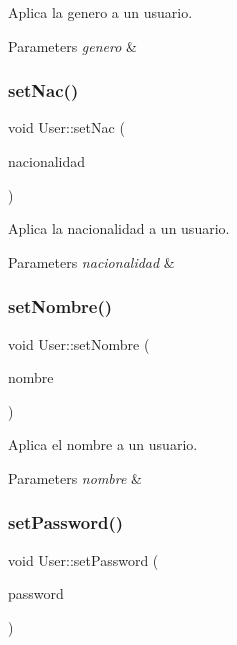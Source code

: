 Aplica la genero a un usuario. 


\begin{DoxyParams}{Parameters}
{\em genero} & \\
\hline
\end{DoxyParams}
\mbox{\label{classUser_ab3992a71bc607e8c919a7d9f941c9b4f}} 
\subsubsection{\texorpdfstring{set\+Nac()}{setNac()}}
{\footnotesize\ttfamily void User\+::set\+Nac (\begin{DoxyParamCaption}\item[{Q\+String}]{nacionalidad }\end{DoxyParamCaption})}



Aplica la nacionalidad a un usuario. 


\begin{DoxyParams}{Parameters}
{\em nacionalidad} & \\
\hline
\end{DoxyParams}
\mbox{\label{classUser_ac8bd16ed398601492fc2550d64fa55a2}} 
\subsubsection{\texorpdfstring{set\+Nombre()}{setNombre()}}
{\footnotesize\ttfamily void User\+::set\+Nombre (\begin{DoxyParamCaption}\item[{Q\+String}]{nombre }\end{DoxyParamCaption})}



Aplica el nombre a un usuario. 


\begin{DoxyParams}{Parameters}
{\em nombre} & \\
\hline
\end{DoxyParams}
\mbox{\label{classUser_a2fa7106fd6d96c663e34ebe82526d5ee}} 
\subsubsection{\texorpdfstring{set\+Password()}{setPassword()}}
{\footnotesize\ttfamily void User\+::set\+Password (\begin{DoxyParamCaption}\item[{Q\+String}]{password }\end{DoxyParamCaption})}



